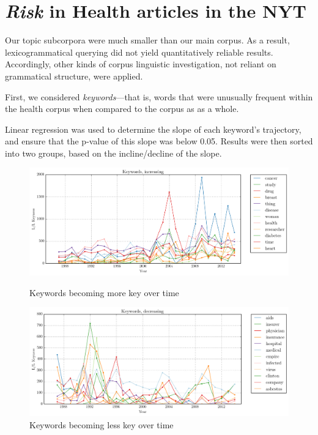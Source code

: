 \chapter{\emph{Risk} in Health articles in the NYT}

    Our topic subcorpora were much smaller than our main corpus. As a result, lexicogrammatical querying did not yield quantitatively reliable results. Accordingly, other kinds of corpus linguistic investigation, not reliant on grammatical structure, were applied. 

    First, we considered \emph{keywords}---that is, words that were unusually frequent within the health corpus when compared to the corpus as as a whole.

    Linear regression was used to determine the slope of each keyword's trajectory, and ensure that the p-value of this slope was below 0.05. Results were then sorted into two groups, based on the incline\slash decline of the slope.

    \begin{figure}[htb!]
    \centering
    \begin{minipage}{.48\textwidth}
    \centering
    \includegraphics[width=.95\textwidth]{../images/keywords-increasing.png}
    \caption{Keywords becoming more key over time}
    \label{fig:key-inc}
    \end{minipage}%
    \begin{minipage}{.48\textwidth}
    \centering
    \includegraphics[width=.95\textwidth]{../images/keywords-decreasing.png}
    \caption{Keywords becoming less key over time}
    \label{fig:key-dec}
    \end{minipage}
    \end{figure}

